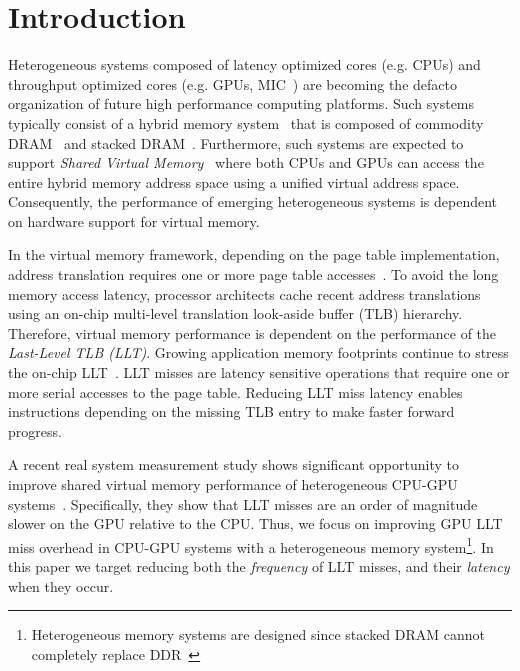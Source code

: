 
\section{Introduction}

\noindent Heterogeneous systems composed of latency
optimized cores (e.g. CPUs) and throughput optimized cores (e.g. GPUs,
MIC~\cite{MIC}) are becoming the defacto organization of future high
performance computing platforms. Such systems typically consist of a
hybrid memory system~\cite{hbm_intel,hbm_amd,hbm_nvidia} that is
composed of commodity DRAM~\cite{ddr4-spec} and stacked
DRAM~\cite{hbm-spec,hmc_spec}. Furthermore, such systems are expected
to support {\em Shared Virtual Memory}~\cite{HSA,UVM} where both CPUs
and GPUs can access the entire hybrid memory address space using a
unified virtual address space. Consequently, the performance of
emerging heterogeneous systems is dependent on hardware support for
virtual memory.

In the virtual memory framework, depending on the page table implementation,
address translation requires one or more page table accesses~\cite{Bhargava2008}.
To avoid the long memory access latency, processor architects cache recent address translations
using an on-chip multi-level translation look-aside buffer (TLB)
hierarchy. Therefore, virtual memory performance is dependent on the
performance of the {\em Last-Level TLB (LLT)}.
Growing application memory footprints continue to stress the on-chip
LLT~\cite{spectlb, Basu2013, SharedLLT, COLT}. LLT misses are latency
sensitive operations that require one or more serial accesses to the
page table. Reducing LLT miss latency enables instructions depending
on the missing TLB entry to make faster forward progress.

A recent real system measurement study shows significant opportunity
to improve shared virtual memory performance of heterogeneous CPU-GPU
systems~\cite{vesley2016ispass}. Specifically, they show that LLT
misses are an order of magnitude slower on the GPU relative to the
CPU. Thus, we focus on improving GPU LLT miss overhead in CPU-GPU
systems with a heterogeneous memory system\footnote{Heterogeneous
memory systems are designed since stacked DRAM cannot completely
replace DDR~\cite{BEAR,moin2012}}. 
In this paper we target reducing both the {\em frequency}
of LLT misses, and their {\em latency} when they occur.


